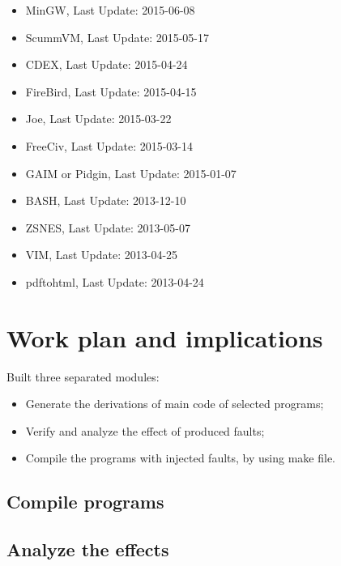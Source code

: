 
\begin{itemize}
	\item MinGW, Last Update: 2015-06-08
	\item ScummVM, Last Update: 2015-05-17
	\item CDEX, Last Update: 2015-04-24
	\item FireBird, Last Update: 2015-04-15
	\item Joe, Last Update: 2015-03-22
	\item FreeCiv, Last Update: 2015-03-14
	\item GAIM or Pidgin, Last Update: 2015-01-07
	\item BASH, Last Update: 2013-12-10
	\item ZSNES, Last Update: 2013-05-07
	\item VIM, Last Update: 2013-04-25
	\item pdftohtml, Last Update: 2013-04-24
\end{itemize}

\newpage
\section{Work plan and implications}

Built three separated modules:

\begin{itemize}
	\item Generate the derivations of main code of selected programs;
	\item Verify and analyze the effect of produced faults;
	\item Compile the programs with injected faults, by using make file.
\end{itemize}






\subsection{Compile programs}



\subsection{Analyze the effects}

